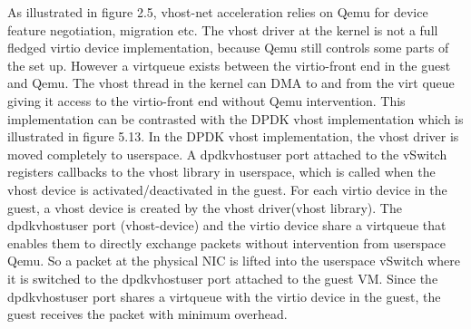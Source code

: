 As illustrated in figure 2.5, vhost-net acceleration relies on Qemu for device feature negotiation, migration etc. The vhost driver at the kernel is not a full fledged virtio device implementation, because Qemu still controls some parts of the set up. However a virtqueue exists between the virtio-front end in the guest and Qemu. The vhost thread in the kernel can DMA to and from the virt queue giving it access to the virtio-front end without Qemu intervention. This implementation can be contrasted with the DPDK vhost implementation which is illustrated in figure 5.13. In the DPDK vhost implementation, the vhost driver is moved completely to userspace. A dpdkvhostuser port attached to the vSwitch registers callbacks to the vhost library in userspace, which is called when the vhost device is activated/deactivated in the guest. For each virtio device in the guest, a vhost device is created by the vhost driver(vhost library). The dpdkvhostuser port (vhost-device) and the virtio device share a virtqueue that enables them to directly exchange packets without intervention from userspace Qemu. So a packet at the physical NIC is lifted into the userspace vSwitch where it is switched to the dpdkvhostuser port attached to the guest VM. Since the dpdkvhostuser port shares a virtqueue with the virtio device in the guest, the guest receives the packet with minimum overhead.
